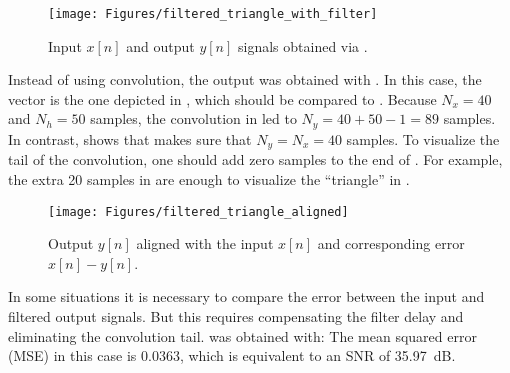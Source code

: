\begin{figure}
\centering
\texttt{[image: Figures/filtered\_triangle\_with\_filter]}
\caption{Input $x[n]$ and output $y[n]$ signals obtained via .\label{fig:filtered_triangle_with_filter}}
\end{figure}

Instead of using convolution, the output was obtained with . In this case, the vector  is the one depicted in , which should be compared to . Because $N_x=40$ and $N_h=50$ samples, the convolution in  led to $N_y=40+50-1=89$ samples. In contrast,  shows that  makes sure that $N_y=N_x=40$ samples. To visualize the tail of the convolution, one should add zero samples to the end of . For example, the extra 20 samples in  are enough to visualize the ``triangle'' in .

\begin{figure}
\centering
\texttt{[image: Figures/filtered\_triangle\_aligned]}
\caption{Output $y[n]$ aligned with the input $x[n]$ and corresponding error $x[n]-y[n]$.\label{fig:filtered_triangle_aligned}}
\end{figure}

In some situations it is necessary to compare the error between the input and filtered output signals. But this requires compensating the filter delay and eliminating the convolution tail.
 was obtained with:
The mean squared error (MSE) in this case is 0.0363, which is equivalent to an SNR of 35.97~dB.


